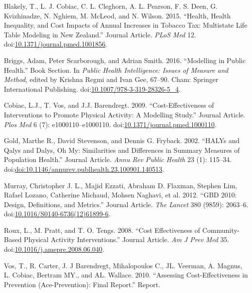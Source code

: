 \documentclass[]{article}
\begin{document}
\hypertarget{ref-RN8299}{}
Blakely, T., L. J. Cobiac, C. L. Cleghorn, A. L. Pearson, F. S. Deen, G.
Kvizhinadze, N. Nghiem, M. McLeod, and N. Wilson. 2015. ``Health, Health
Inequality, and Cost Impacts of Annual Increases in Tobacco Tax:
Multistate Life Table Modeling in New Zealand.'' Journal Article.
\emph{PLoS Med} 12.
doi:\href{https://doi.org/10.1371/journal.pmed.1001856}{10.1371/journal.pmed.1001856}.

\hypertarget{ref-RN8957}{}
Briggs, Adam, Peter Scarborough, and Adrian Smith. 2016. ``Modelling in
Public Health.'' Book Section. In \emph{Public Health Intelligence:
Issues of Measure and Method}, edited by Krishna Regmi and Ivan Gee,
67--90. Cham: Springer International Publishing.
doi:\href{https://doi.org/10.1007/978-3-319-28326-5_4}{10.1007/978-3-319-28326-5\_4}.

\hypertarget{ref-RN21}{}
Cobiac, L.J., T. Vos, and J.J. Barendregt. 2009. ``Cost-Effectiveness of
Interventions to Promote Physical Activity: A Modelling Study.'' Journal
Article. \emph{Plos Med} 6 (7): e1000110--e1000110.
doi:\href{https://doi.org/10.1371/journal.pmed.1000110}{10.1371/journal.pmed.1000110}.

\hypertarget{ref-RN8158}{}
Gold, Marthe R., David Stevenson, and Dennis G. Fryback. 2002. ``HALYs
and Qalys and Dalys, Oh My: Similarities and Differences in Summary
Measures of Population Health.'' Journal Article. \emph{Annu Rev Public
Health} 23 (1): 115--34.
doi:\href{https://doi.org/doi:10.1146/annurev.publhealth.23.100901.140513}{doi:10.1146/annurev.publhealth.23.100901.140513}.

\hypertarget{ref-RN8153}{}
Murray, Christopher J. L., Majid Ezzati, Abraham D. Flaxman, Stephen
Lim, Rafael Lozano, Catherine Michaud, Mohsen Naghavi, et al. 2012.
``GBD 2010: Design, Definitions, and Metrics.'' Journal Article.
\emph{The Lancet} 380 (9859): 2063--6.
doi:\href{https://doi.org/10.1016/S0140-6736(12)61899-6}{10.1016/S0140-6736(12)61899-6}.

\hypertarget{ref-RN8262}{}
Roux, L., M. Pratt, and T. O. Tengs. 2008. ``Cost Effectiveness of
Community-Based Physical Activity Interventions.'' Journal Article.
\emph{Am J Prev Med} 35.
doi:\href{https://doi.org/10.1016/j.amepre.2008.06.040}{10.1016/j.amepre.2008.06.040}.

\hypertarget{ref-RN38}{}
Vos, T., R. Carter, J. J Barendregt, Mihalopoulos C., JL. Veerman, A.
Magnus, L. Cobiac, Bertram MY., and AL. Wallace. 2010. ``Assessing
Cost-Effectiveness in Prevention (Ace-Prevention): Final Report.''
Report.
\end{document}
